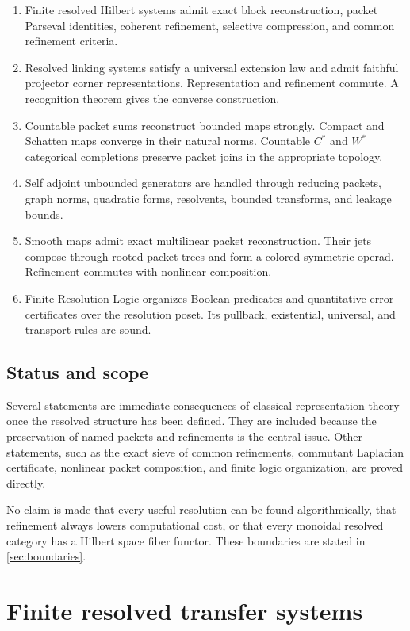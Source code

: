 \documentclass{aomart}
\theoremstyle{definition}
\theoremstyle{remark}
\begin{document}
\begin{enumerate}
\item Finite resolved Hilbert systems admit exact block reconstruction, packet Parseval identities, coherent refinement, selective compression, and common refinement criteria.
\item Resolved linking systems satisfy a universal extension law and admit faithful projector corner representations. Representation and refinement commute. A recognition theorem gives the converse construction.
\item Countable packet sums reconstruct bounded maps strongly. Compact and Schatten maps converge in their natural norms. Countable \(C^*\) and \(W^*\) categorical completions preserve packet joins in the appropriate topology.
\item Self adjoint unbounded generators are handled through reducing packets, graph norms, quadratic forms, resolvents, bounded transforms, and leakage bounds.
\item Smooth maps admit exact multilinear packet reconstruction. Their jets compose through rooted packet trees and form a colored symmetric operad. Refinement commutes with nonlinear composition.
\item Finite Resolution Logic organizes Boolean predicates and quantitative error certificates over the resolution poset. Its pullback, existential, universal, and transport rules are sound.
\end{enumerate}

\subsection{Status and scope}

Several statements are immediate consequences of classical representation theory once the resolved structure has been defined. They are included because the preservation of named packets and refinements is the central issue. Other statements, such as the exact sieve of common refinements, commutant Laplacian certificate, nonlinear packet composition, and finite logic organization, are proved directly.

No claim is made that every useful resolution can be found algorithmically, that refinement always lowers computational cost, or that every monoidal resolved category has a Hilbert space fiber functor. These boundaries are stated in \cref{sec:boundaries}.

\section{Finite resolved transfer systems}\label{sec:finite}
\end{document}
